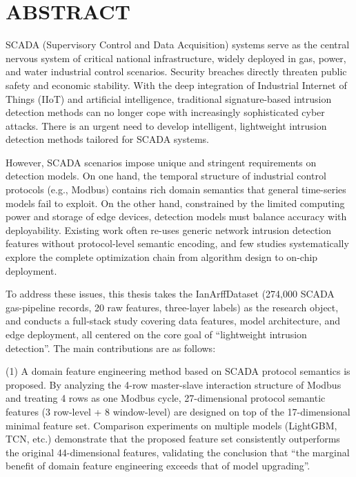 \chapter*{\hfill ABSTRACT \hfill}

\par SCADA (Supervisory Control and Data Acquisition) systems serve as the central
nervous system of critical national infrastructure, widely deployed in gas, power,
and water industrial control scenarios. Security breaches directly threaten public
safety and economic stability. With the deep integration of Industrial Internet of
Things (IIoT) and artificial intelligence, traditional signature-based intrusion
detection methods can no longer cope with increasingly sophisticated cyber attacks.
There is an urgent need to develop intelligent, lightweight intrusion detection
methods tailored for SCADA systems.

\par However, SCADA scenarios impose unique and stringent requirements on detection
models. On one hand, the temporal structure of industrial control protocols (e.g.,
Modbus) contains rich domain semantics that general time-series models fail to
exploit. On the other hand, constrained by the limited computing power and storage
of edge devices, detection models must balance accuracy with deployability. Existing
work often re-uses generic network intrusion detection features without protocol-level
semantic encoding, and few studies systematically explore the complete optimization
chain from algorithm design to on-chip deployment.

\par To address these issues, this thesis takes the IanArffDataset (274{,}000
SCADA gas-pipeline records, 20 raw features, three-layer labels) as the research
object, and conducts a full-stack study covering data features, model architecture,
and edge deployment, all centered on the core goal of ``lightweight intrusion
detection''. The main contributions are as follows:

\par (1) A domain feature engineering method based on SCADA protocol semantics is
proposed. By analyzing the 4-row master-slave interaction structure of Modbus
and treating 4 rows as one Modbus cycle, 27-dimensional protocol semantic features
(3 row-level + 8 window-level) are designed on top of the 17-dimensional minimal
feature set. Comparison experiments on multiple models (LightGBM, TCN, etc.)
demonstrate that the proposed feature set consistently outperforms the original
44-dimensional features, validating the conclusion that ``the marginal benefit of
domain feature engineering exceeds that of model upgrading''.

